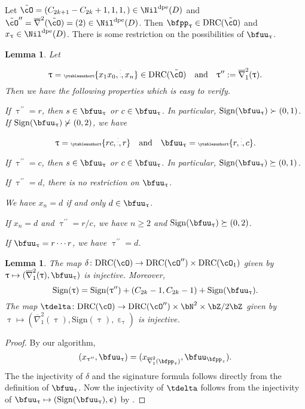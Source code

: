 \documentclass[12pt,a4paper]{amsart}
\def\eDD{\overline{\nabla}}
\def\eDDo{\overline{\nabla}_1}
\numberwithin{equation}{section}
\newtheorem{lem}[thm]{Lemma}
\theoremstyle{remark}
\def\dpeNil{\Nil^{\mathrm{dpe}}}
\def\ssign{\mathrm{Sign}}
\def\drc{\mathrm{DRC}}
\let\ytb=\ytableaushort
\newcommand{\tytb}[1]{{\tiny\ytb{#1}}}
\def\cOpp{\cO^{\prime\prime}}
\def\uptaupp{\uptau^{\prime\prime}}
\def\tcO{\tilde{\cO}}
\def\tcOpp{\tcO^{\prime\prime}}
\begin{document}
Let $\tcO = (C_{2k+1}-C_{2k}+1,1,1,)\in \dpeNil(D)$ and
$\tcOpp = \eDD^{2}(\tcO) = (2)\in \dpeNil(D)$. Then
$\bfpp_{\uptau}\in \drc(\tcO)$ and $x_{\uptau}\in\dpeNil(D)$.
There is some restriction on the possibilities  of $\bfuu_{\uptau}$.

\begin{lem}\label{lem:u}
  Let
  \[
    \uptau = \tytb{{x_{1}}{x_{0}},\vdots, {x_{n}}}\in \drc(\tcO)
    \quad \text{and}\quad \uptaupp:=\eDDo^{2}(\uptau).
  \]
  Then we have the following properties which is easy to verify.
  \begin{enumS}
    \item  If $\uptaupp = r$, then $s \in \bfuu_{\uptau}$ or
    $c \in \bfuu_{\uptau}$. In particular, $\ssign(\bfuu_{\uptau})\succ (0,1)$.
    If $\ssign(\bfuu_{\uptau})\nsucc (0,2)$, we have
    \[
      \uptau = \tytb{rc, \vdots,r} \quad \text{and}\quad  \bfuu_{\uptau} = \tytb{r,\vdots,c}.
    \]
    \item  If $\uptaupp = c$, then $s \in \bfuu_{\uptau}$ or
    $c \in \bfuu_{\uptau}$. In particular, $\ssign(\bfuu_{\uptau})\succeq (0,1)$.
    \item If $\uptaupp = d$, there is no restriction on $\bfuu_{\uptau}$.
    \item  We have $x_{n}=d$ if and only $d\in \bfuu_{\uptau}$.
    \item If $x_{n}=d$ and $\uptaupp =r/c$,  we have $n\geq 2$ and
    $\ssign(\bfuu_{\uptau})\succeq (0,2)$.
    \item If $\bfuu_{\uptau} = r\cdots r$, we have $\uptaupp=d$.
  \end{enumS}

\end{lem}


\begin{lem}\label{lem:gd.inj}
  The map $\delta\colon  \drc(\cO)\rightarrow \drc(\cOpp) \times \drc(\cO_{1})$
  given by $\uptau\mapsto (\eDDo^{2}(\uptau),\bfuu_{\uptau})$ is injective.
  Moreover,
  \[
  \ssign(\uptau) =\ssign(\uptaupp) + (C_{2k}-1, C_{2k}-1)+\ssign(\bfuu_{\uptau}).
  \]
  The map $\tdelta\colon \drc(\cO)\rightarrow \drc(\cOpp) \times \bN^{2}\times \bZ/2\bZ$
  given by $\uptau\mapsto (\eDDo^{2}(\uptau), \ssign(\uptau),\upepsilon_{\uptau})$ is injective.
\end{lem}
\begin{proof}
  By our algorithm,
  \[
    (x_{\uptaupp},\bfuu_{\uptau}) = (x_{\eDDo^{2}(\bfpp_{\uptau})}, \bfuu_{\bfpp_{\uptau}}).
  \]
  The the injectivity of $\delta$ and the siginature formula follows directly
  from the definition of $\bfuu_{\uptau}$.
  Now the injectivity of $\tdelta$ follows from the injectivity of
  $\bfuu_{\uptau}\mapsto (\ssign(\bfuu_{\uptau}), \upepsilon)$ by
  .
\end{proof}
\end{document}
